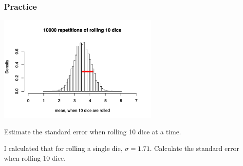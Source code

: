 \begin{frame}
\frametitle{Practice}
\vspace{-20pt}
\begin{center}
\includegraphics[width=0.6\textwidth]{4-1_var_in_est/figures/six_sided_dice/rolls_by_10_SE.pdf}
\end{center}
\vspace{-20pt}Estimate the standard error when rolling 10 dice at a time.

\pause {}
\vfill
\pause
I calculated that for rolling a single die, $\sigma = 1.71$. Calculate the standard error when rolling 10 dice.
\pause
{}
\vfill
\end{frame}
